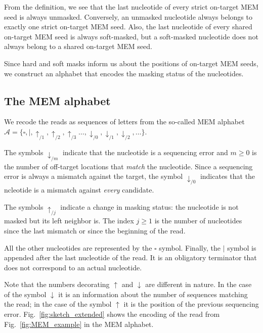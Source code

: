 \documentclass{article}
\begin{document}
From the definition, we see that the last nucleotide of every strict
on-target MEM seed is always unmasked. Conversely, an unmasked nucleotide
always belongs to exactly one strict on-target MEM seed. Also, the last
nucleotide of every shared on-target MEM seed is always soft-masked, but a
soft-masked nucleotide does not always belong to a shared on-target MEM
seed.

Since hard and soft masks inform us about the positions of on-target
MEM seeds, we construct an alphabet that encodes the masking status of the
nucleotides.

\subsection{The MEM alphabet}

We recode the reads as sequences of letters from the so-called MEM
alphabet $\mathcal{A} = \{\square, |, \uparrow_{/1}, \uparrow_{/2},
\uparrow_{/3} \ldots, \downarrow_{/0}, \downarrow_{/1}, \downarrow_{/2},
\ldots\}$.

The symbols $\downarrow_{/m}$ indicate that the nucleotide is a sequencing
error and $m \geq 0$ is the number of off-target locations that
\emph{match} the nucleotide. Since a sequencing error is always a mismatch
against the target, the symbol $\downarrow_{/0}$ indicates that the
ncleotide is a mismatch against \emph{every} candidate.

The symbols $\uparrow_{/j}$ indicate a change in masking status: the
nucleotide is not masked but its left neighbor is. The index $j \geq 1$ is
the number of nucleotides since the last mismatch or since the beginning
of the read.

All the other nucleotides are represented by the $\square$ symbol.
Finally, the $|$ symbol is appended after the last nucleotide of the read.
It is an obligatory terminator that does not correspond to an actual
nucleotide.

Note that the numbers decorating $\uparrow$ and $\downarrow$ are different
in nature. In the case of the symbol $\downarrow$ it is an information
about the number of sequences matching the read; in the case of the symbol
$\uparrow$ it is the position of the previous sequencing error.
Fig.~\ref{fig:sketch_extended} shows the encoding of the read from
Fig.~\ref{fig:MEM_example} in the MEM alphabet.
\end{document}
